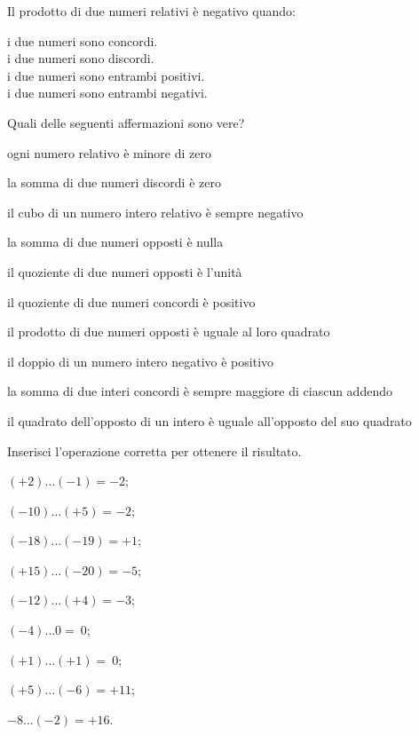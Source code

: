 \begin{esercizio}
Il prodotto di due numeri relativi è negativo quando:
 \begin{multicols}{2}
 \noindent
 \usebox\boxa\: i due numeri sono concordi.\\
 \usebox\boxb\: i due numeri sono discordi.\\
 \usebox\boxc\: i due numeri sono entrambi positivi.\\
 \usebox\boxd\: i due numeri sono entrambi negativi.
 \end{multicols}
\end{esercizio}

\begin{esercizio}
Quali delle seguenti affermazioni sono vere?
\TabPositions{12cm}
\begin{enumeratea}
 \item ogni numero relativo è minore di zero \tab\boxV\quad\boxF
 \item la somma di due numeri discordi è zero \tab\boxV\quad\boxF
 \item il cubo di un numero intero relativo è sempre negativo \tab\boxV\quad\boxF
 \item la somma di due numeri opposti è nulla \tab\boxV\quad\boxF
 \item il quoziente di due numeri opposti è l'unità \tab\boxV\quad\boxF
 \item il quoziente di due numeri concordi è positivo \tab\boxV\quad\boxF
 \item il prodotto di due numeri opposti è uguale al loro quadrato \tab\boxV\quad\boxF
 \item il doppio di un numero intero negativo è positivo \tab\boxV\quad\boxF
 \item la somma di due interi concordi è sempre maggiore di ciascun addendo \tab\boxV\quad\boxF
 \item il quadrato dell'opposto di un intero è uguale all'opposto del suo quadrato \tab\boxV\quad\boxF
\end{enumeratea}
\end{esercizio}

\begin{esercizio}
Inserisci l'operazione corretta per ottenere il risultato.
 \begin{multicols}{3}
 \begin{enumeratea}
 \item $(+2)\ldots(-1) = -2$;
 \item $(-10)\ldots(+5) = -2$;
 \item $(-18)\ldots(-19) = +1$;
 \item $(+15)\ldots(-20) = -5$;
 \item $(-12)\ldots(+4) = -3$;
 \item $(-4)\ldots0 =~0$;
 \item $(+1)\ldots(+1) =~0$;
 \item $(+5)\ldots(-6) = +11$;
 \item $-8\ldots(-2) = +16$.
 \end{enumeratea}
 \end{multicols}
\end{esercizio}


